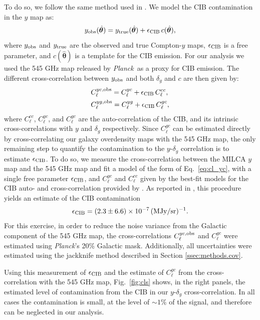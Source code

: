 \documentclass[useAMS,usenatbib]{mn2e}
\newcommand{\nv}{\hat{\boldsymbol{\theta}}}
\def\planck{{\it Planck\/}}
\begin{document}
      To do so, we follow the same method used in \cite{2017MNRAS.467.2315V}. We model the CIB contamination in the $y$ map as:
      \begin{equation}
        y_{\rm obs}(\nv)=y_{\rm true}(\nv)+\epsilon_{\rm CIB}\,c(\nv),
      \end{equation}
      where $y_{\rm obs}$ and $y_{\rm true}$ are the observed and true Compton-$y$ maps, $\epsilon_{\rm CIB}$ is a free parameter, and $c(\nv)$ is a template for the CIB emission. For our analysis we used the 545 GHz map released by \planck\ as a proxy for CIB emission. The different cross-correlation between $y_{\rm obs}$ and both $\delta_g$ and $c$ are then given by:
      \begin{align}\label{eq:cl_yc}
        &C^{yc,{\rm obs}}_\ell= C^{yc}_\ell+\epsilon_{\rm CIB}\,C^{cc}_\ell,\\
        &C^{yg,{\rm obs}}_\ell= C^{yg}_\ell+\epsilon_{\rm CIB}\,C^{gc}_\ell,
      \end{align}
      where $C^{cc}_\ell$, $C^{yc}_\ell$,  and  $C^{gc}_\ell$ are the auto-correlation of the CIB, and its intrinsic cross-correlations with $y$ and $\delta_g$ respectively. Since $C^{gc}_\ell$ can be estimated directly by cross-correlating our galaxy overdensity maps with the 545 GHz map, the only remaining step to quantify the contamination to the $y$-$\delta_g$ correlation is to estimate $\epsilon_{\rm CIB}$. To do so, we measure the cross-correlation between the MILCA $y$ map and the 545 GHz map and fit a model of the form of Eq.\!~\ref{eq:cl_yc}, with a single free parameter $\epsilon_{\rm CIB}$, and $C^{yc}_\ell$ and $C^{cc}_\ell$ given by the best-fit models for the CIB auto- and cross-correlation provided by \cite{2014A&A...571A..30P,2016A&A...594A..23P}. As reported in \cite{2018PhRvD..97f3514A}, this procedure yields an estimate of the CIB contamination
      \begin{equation}
        \epsilon_{\rm CIB}=(2.3\pm6.6)\times10^{-7}\,({\rm MJy}/{\rm sr})^{-1}.
      \end{equation}
      For this exercise, in order to reduce the noise variance from the Galactic component of the 545 GHz map, the cross-correlations $C^{yc,{\rm obs}}_\ell$ and $C^{gc}_\ell$ were estimated using \planck's 20\% Galactic mask. Additionally, all uncertainties were estimated using the jackknife method described in Section \ref{ssec:methods.cov}.
      
      Using this measurement of $\epsilon_{\rm CIB}$ and the estimate of $C^{gc}_\ell$ from the cross-correlation with the 545 GHz map, Fig.\!~\ref{fig:cls} shows, in the right panels, the estimated level of contamination from the CIB in our $y$-$\delta_g$ cross-correlation. In all cases the contamination is small, at the level of $\sim1\%$ of the signal, and therefore can be neglected in our analysis.
\end{document}
